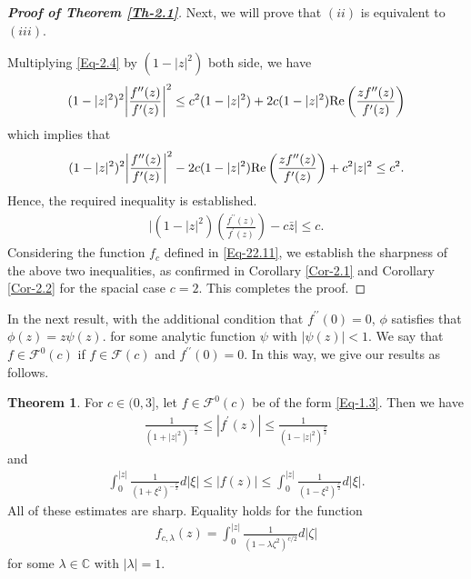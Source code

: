 \documentclass[a4paper,12pt]{amsart}
\theoremstyle{plain}
\theoremstyle{definition}
\newtheorem{thm}{Theorem}[section]
\theoremstyle{plain}
\begin{document}
\begin{proof}[\bf Proof of Theorem \ref{Th-2.1}]
	\noindent Next, we will prove that $(ii)$ is equivalent to $(iii)$.\vspace{2mm} 
	
	\noindent Multiplying \eqref{Eq-2.4} by $(1-|z|^2)$ both side, we have
	\begin{align*}
		(1-|z|^2)^2\bigg|\frac{f^{\prime\prime}(z)}{f^{\prime}(z)}\bigg|^2\leq c^2(1-|z|^2)+2c(1-|z|^2){\rm Re}\left(\frac{zf^{\prime\prime}(z)}{f^{\prime}(z)}\right)
	\end{align*}
	which implies that 
	\begin{align*}
		(1-|z|^2)^2\bigg|\frac{f^{\prime\prime}(z)}{f^{\prime}(z)}\bigg|^2-2c(1-|z|^2){\rm Re}\left(\frac{zf^{\prime\prime}(z)}{f^{\prime}(z)}\right)+c^2|z|^2\leq c^2.
	\end{align*}
	Hence, the required inequality is established.
	\begin{align*}
		\bigg|	(1-|z|^2)\left(\frac{f^{\prime\prime}(z)}{f^{\prime}(z)}\right)-c\bar{z}\bigg|\leq c.
	\end{align*}
	Considering the function \( f_c \) defined in \eqref{Eq-22.11}, we establish the sharpness of the above two inequalities, as confirmed in Corollary \ref{Cor-2.1} and Corollary \ref{Cor-2.2} for the spacial case \( c= 2 \). This completes the proof.
\end{proof}
In the next result, with the additional condition that $f^{\prime\prime}(0)=0$, $\phi$ satisfies that $\phi(z)=z\psi(z)$. for some analytic function $\psi$ with $|\psi(z)|<1$. We say that $f\in \mathcal{F}^0(c)$ if $f\in\mathcal{F}(c)$ and $f^{\prime\prime}(0)=0$. In this way, we give our results as follows.
\begin{thm}\label{Th-2.2}
	For $c\in(0,3]$, let $f\in \mathcal{F}^0(c)$ be of the form \eqref{Eq-1.3}. Then we have
	\begin{align}
		\frac{1}{(1+|z|^2)^{-\frac{c}{2}}}\leq|f^{\prime}(z)|\leq\frac{1}{(1-|z|^2)^\frac{c}{2}}	
	\end{align}
	and
	\begin{align}
		\int_{0}^{|z|}\frac{1}{(1+\xi^2)^{-\frac{c}{2}}} d|\xi|\leq	|f(z)|\leq\int_{0}^{|z|}\frac{1}{(1-\xi^2)^\frac{c}{2}} d|\xi|.
	\end{align}
	All of these estimates are sharp. Equality holds for the function 
	\begin{align*}
		f_{c, \lambda}(z)=\int_{0}^{|z|}\frac{1}{(1-\lambda \zeta^2)^{c/2}}d|\zeta|
	\end{align*} 
	for some $\lambda\in\mathbb{C}$ with $|\lambda|=1$.
\end{thm}
\end{document}
